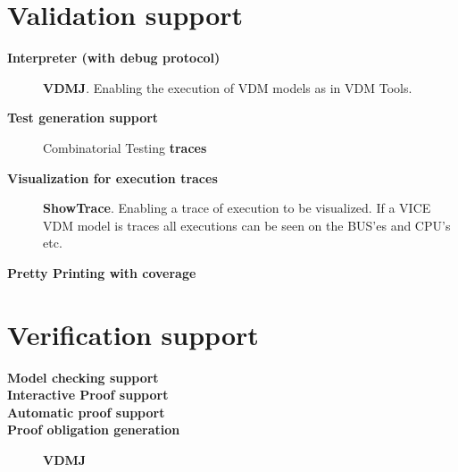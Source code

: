 \documentclass[11pt,a4paper,oneside]{report}
\begin{document}
\section{Validation support}
\begin{description}
	\item[\textbf{Interpreter (with debug protocol)}] \textbf{VDMJ}. Enabling the execution of VDM models as in VDM Tools.

	\item[\textbf{Test generation support}] Combinatorial Testing \textbf{traces}

	\item[\textbf{Visualization for execution traces}] \textbf{ShowTrace}. Enabling a trace of execution to be visualized. If a VICE VDM model is traces all executions can be seen on the BUS'es and CPU's etc.

	\item[\textbf{Pretty Printing with coverage}] 
\end{description}

\section{Verification support}
\begin{description}
	\item[\textbf{Model checking support}] 

	\item[\textbf{Interactive Proof support}] 

	\item[\textbf{Automatic proof support}] 

	\item[\textbf{Proof obligation generation}] \textbf{VDMJ}
\end{description}
\end{document}
